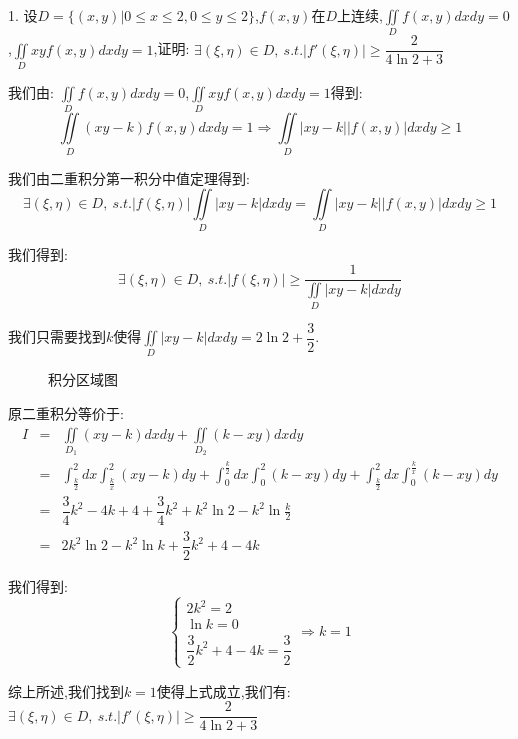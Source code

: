 1. 设$D=\{(x,y)|0\leq x\leq 2,0\leq y\leq 2\}$,$f(x,y)$在$D$上连续,$\iint\limits_{D}f(x,y)dxdy=0$,$\iint\limits_{D}xyf(x,y)dxdy=1$,证明: $\exists (\xi,\eta)\in D,\ s.t. |f'(\xi,\eta)|\geq \dfrac{2}{4\ln 2+3}$
\begin{solution}
	
	我们由: $\iint\limits_{D}f(x,y)dxdy=0$,$\iint\limits_{D}xyf(x,y)dxdy=1$得到: 
	$$\iint\limits_{D}(xy-k)f(x,y)dxdy=1\Rightarrow \iint\limits_{D}|xy-k||f(x,y)|dxdy\geq 1$$
	
	我们由二重积分第一积分中值定理得到: 
	$$\exists (\xi,\eta)\in D, \ s.t. |f(\xi,\eta)|\iint\limits_{D}|xy-k|dxdy=\iint\limits_{D}|xy-k||f(x,y)|dxdy\geq 1$$
	
	我们得到: 
	$$\exists (\xi,\eta)\in D, \ s.t. |f(\xi,\eta)|\geq \dfrac{1}{\iint\limits_{D}|xy-k|dxdy}$$
	
	我们只需要找到$k$使得$\iint\limits_{D}|xy-k|dxdy=2\ln2+\dfrac{3}{2}$.
	\begin{figure}[htbp]
		\centering
		\caption{积分区域图}
		\label{积分区域图}
	\end{figure} 
	
	原二重积分等价于: 
	\begin{eqnarray*}
		I&=&\iint\limits_{D_{1}}(xy-k)dxdy+\iint\limits_{D_{2}}(k-xy)dxdy\\
		&=&\int_{\frac{k}{2}}^{2}dx\int_{\frac{k}{x}}^{2}(xy-k)dy+\int_{0}^{\frac{k}{2}}dx\int_{0}^{2}(k-xy)dy+\int_{\frac{k}{2}}^{2}dx\int_{0}^{\frac{k}{x}}(k-xy)dy\\
		&=&\dfrac{3}{4}k^2-4k+4+\dfrac{3}{4}k^2+k^2\ln 2-k^2\ln \frac{k}{2}\\
		&=&2k^2\ln 2-k^2\ln k+\dfrac{3}{2}k^2+4-4k
	\end{eqnarray*}
	
	我们得到: 
	$$\left\lbrace
	\begin{array}{l}
		2k^2=2\\
		\ln k=0\\
		\dfrac{3}{2}k^2+4-4k=\dfrac{3}{2}
	\end{array}
	\right. \Rightarrow k=1$$
	
	综上所述,我们找到$k=1$使得上式成立,我们有: $\exists (\xi,\eta)\in D,\ s.t. |f'(\xi,\eta)|\geq \dfrac{2}{4\ln 2+3}$
\end{solution}

